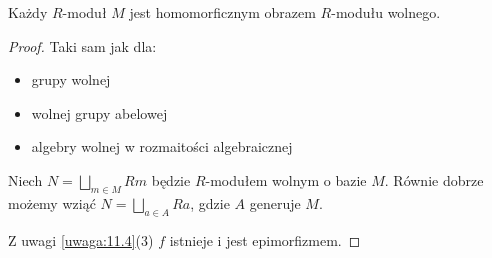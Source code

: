 \begin{remark}
  Każdy $R$-moduł $M$ jest homomorficznym obrazem $R$-modułu wolnego.
\end{remark}
\begin{proof}
  Taki sam jak dla:
  \begin{itemize}
    \item grupy wolnej
    \item wolnej grupy abelowej
    \item algebry wolnej w rozmaitości algebraicznej
  \end{itemize}

  Niech $N=\bigsqcup_{m\in M}Rm$ będzie $R$-modułem wolnym o bazie $M$. Równie dobrze możemy wziąć $N=\bigsqcup_{a\in A} Ra$, gdzie $A$ generuje $M$.

  \begin{center}
  \end{center}

  Z uwagi \ref{uwaga:11.4}(3) $f$ istnieje i jest epimorfizmem.

\end{proof}


